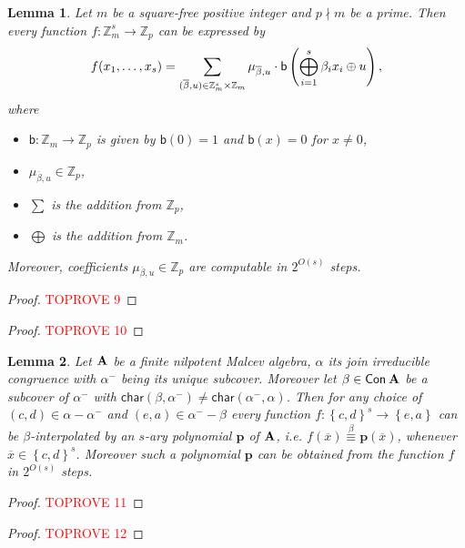 \documentclass[11pt,a4paper]{amsart}
\newtheorem{lm}{Lemma}[section]
\newcommand{\m}[1]{{\uppercase {\bf{#1}}}}
\newcommand{\set}[1]{{\left\{ {#1} \right\} }}
\newcommand{\con}[1]{{\sf Con\:\m{#1}}}
\newcommand{\po}[1]{{\mathbf {#1}}}
\renewcommand{\o}[1]{\overline {#1}}
\newcommand{\map}{\longrightarrow}
\newcommand{\congruent}[1]{\stackrel{#1}{\equiv}}
\newcommand{\charr}{\mathsf{char}}
\newcommand{\setm}{-}
\newcommand{\z}{\mathbb{Z}}
\renewcommand{\b}{\textsf{b}}
\begin{document}
\begin{lm}
\label{lm-zpqe}
Let $m$ be a square-free positive integer and $p\nmid m$ be a prime.
Then every function $f: \z_m^s \map \z_p$ can be expressed by
\[
f(x_1,\ldots,x_s)=\sum_{(\o\beta,u)\in\m \z_m^s\times\z_m}
\mu_{\o\beta,u}\cdot \b\left(\bigoplus_{i=1}^s \beta_i x_i\oplus u\right),
\]
where
\begin{itemize}
    \item $\b:\z_m\map\z_p$ is given by $\b(0)=1$ and $\b(x)=0$ for $x \neq 0$,
    \item $\mu_{\o\beta,u}\in \z_p$,
    \item $\sum$ is the addition from $\mathbb{Z}_p$,
    \item $\bigoplus$ is the addition from $\mathbb{Z}_m$.
\end{itemize}
Moreover, coefficients $\mu_{\o\beta,u}\in \z_p$ are computable in $2^{O(s)}$ steps.
\end{lm}
\begin{proof}\textcolor{red}{TOPROVE 9}\end{proof}


\begin{proof}\textcolor{red}{TOPROVE 10}\end{proof}



\begin{lm}
\label{lm:beta-int}
Let $\m A$ be a finite nilpotent Malcev algebra,
$\alpha$ its join irreducible congruence with $\alpha^-$ being its unique subcover.
Moreover let $\beta\in \con A$ be a subcover of $\alpha^-$ with $\charr(\beta,\alpha^-)\neq\charr(\alpha^-,\alpha)$.
Then for any choice of $(c,d)\in\alpha\setm\alpha^-$ and $(e,a)\in\alpha^-\setm\beta$
every function $f: \set{c,d}^s \map \set{e,a}$ can be $\beta$-interpolated
by an $s$-ary polynomial $\po p$ of $\m A$,
i.e. $f(\o x)\congruent{\beta}\po p(\o x)$, whenever $\o x \in\set{c,d}^s$.
Moreover such a polynomial $\po p$ can be obtained from the function $f$ in $2^{O(s)}$ steps.
\end{lm}

\begin{proof}\textcolor{red}{TOPROVE 11}\end{proof}







\begin{proof}\textcolor{red}{TOPROVE 12}\end{proof}
\end{document}
